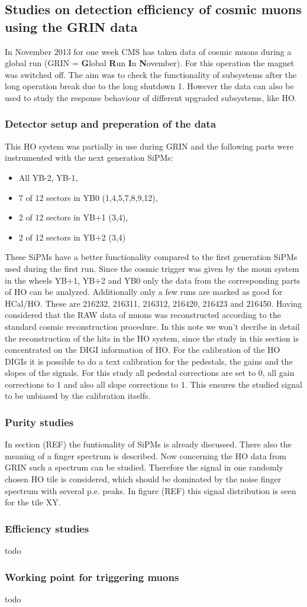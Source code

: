 	\subsection{Studies on detection efficiency of cosmic muons using the GRIN data} 
		In November 2013 for one week CMS has taken data of cosmic muons during a global run (GRIN = \textbf{G}lobal \textbf{R}un \textbf{I}n \textbf{N}ovember).
		For this operation the magnet was switched off.
		The aim was to check the functionality of subsystems after the long operation break due to the long shutdown 1.
		However the data can also be used to study the response behaviour of different upgraded subsystems, like HO.
		\subsubsection{Detector setup and preperation of the data}
			This HO system was partially in use during GRIN and the following parts were instrumented with the next generation SiPMs:
			\begin{itemize}
				\item All YB-2, YB-1,
				\item 7 of 12 sectors in YB0 (1,4,5,7,8,9,12),
				\item 2 of 12 sectors in YB+1 (3,4),
				\item 2 of 12 sectors in YB+2 (3,4)
			\end{itemize}
			These SiPMs have a better functionality compared to the first generation SiPMs used during the first run.
			Since the cosmic trigger was given by the moun system in the wheels YB+1, YB+2 and YB0 only the data from the corresponding parts of HO can be analyzed.
			Additionally only a few runs are marked as good for HCal/HO.
			These are 216232, 216311, 216312, 216420, 216423 and 216450.
			Having considered that the RAW data of muons was reconstructed according to the standard cosmic reconstruction procedure.
			In this note we won't decribe in detail the reconstruction of the hits in the HO system, since the study in this section is concentrated on the DIGI information of HO.
			For the calibration of the HO DIGIs it is possible to do a text calibration for the pedestals, the gains and the slopes of the signals.
			For this study all pedestal corrections are set to 0, all gain corrections to 1 and also all slope corrections to 1.
			This ensures the studied signal to be unbiased by the calibration itselfs. 
		\subsubsection{Purity studies}
			In section (REF) the funtionality of SiPMs is already discussed.
			There also the meaning of a finger spectrum is described.
			Now concerning the HO data from GRIN such a spectrum can be studied.
			Therefore the signal in one randomly chosen HO tile is considered, which should be dominated by the noise finger spectrum with several p.e. peaks.
			In figure (REF) this signal distribution is seen for the tile XY.
			
		\subsubsection{Efficiency studies}
			todo
		\subsubsection{Working point for triggering muons}
			todo
